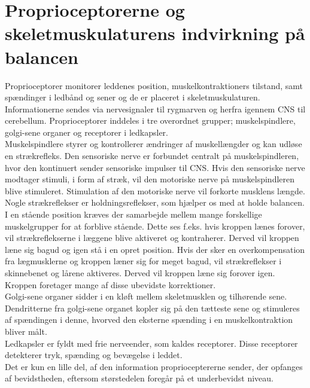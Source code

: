 \section{Proprioceptorerne og skeletmuskulaturens indvirkning på balancen}
Proprioceptorer monitorer leddenes position, muskelkontraktioners tilstand, samt spændinger i ledbånd og sener og de er placeret i skeletmuskulaturen. Informationerne sendes via nervesignaler til rygmarven og herfra igennem CNS til cerebellum. Proprioceptorer inddeles i tre overordnet grupper; muskelspindlere, golgi-sene organer og receptorer i ledkapsler.\cite{Martini2012}    \\
Muskelspindlere styrer og kontrollerer ændringer af muskellængder og kan udløse en strækrefleks. Den sensoriske nerve er forbundet centralt på muskelspindleren, hvor den kontinuert sender sensoriske impulser til CNS. Hvis den sensoriske nerve modtager stimuli, i form af stræk, vil den motoriske nerve på muskelspindleren blive stimuleret. Stimulation af den motoriske nerve vil forkorte musklens længde. Nogle strækreflekser er holdningsreflekser, som hjælper os med at holde balancen. I en stående position kræves der samarbejde mellem mange forskellige muskelgrupper for at forblive stående. Dette ses f.eks. hvis kroppen lænes forover, vil strækreflekserne i læggene blive aktiveret og kontraherer. Derved vil kroppen læne sig bagud og igen stå i en opret position. Hvis der sker en overkompensation fra lægmusklerne og kroppen læner sig for meget bagud, vil strækreflekser i skinnebenet og lårene aktiveres. Derved vil kroppen læne sig forover igen. Kroppen foretager mange af disse ubevidste korrektioner. \cite{Martini2012}   \\ %
Golgi-sene organer sidder i en kløft mellem skeletmusklen og tilhørende sene. Dendritterne fra golgi-sene organet kopler sig på den tætteste sene og stimuleres af spændingen i denne, hvorved den eksterne spænding i en muskelkontraktion bliver målt. \cite{Martini2012}    \\
Ledkapsler er fyldt med frie nerveender, som kaldes receptorer. Disse receptorer detekterer tryk, spænding og bevægelse i leddet. \cite{Martini2012}    \\
Det er kun en lille del, af den information proprioceptererne sender, der opfanges af bevidstheden, eftersom størstedelen foregår på et underbevidst niveau.\cite{Martini2012} \\




